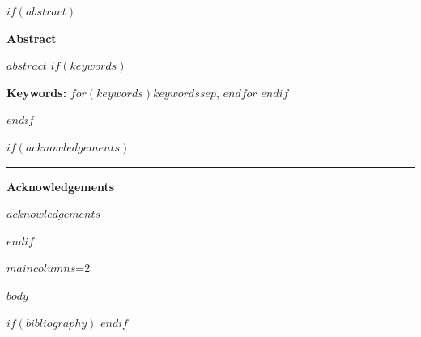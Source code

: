 \documentclass[12pt]{article}
\newif\ifjncanon
\newcommand{\jncmaincolumns}{$maincolumns$}
\newcommand{\jncmaincolumns}{1}
\begin{document}
\begin{titlepage}
\begin{center}
\begin{singlespace}
{}
\end{singlespace}

\vfill

$if(abstract)$
\begin{minipage}{0.8\textwidth}
\small
\singlespacing
\textbf{Abstract}\par
\vspace{0.25em}
$abstract$
$if(keywords)$

\vspace{1em}
\noindent\textbf{Keywords: }$for(keywords)$$keywords$$sep$, $endfor$
$endif$
\end{minipage}
$endif$

\vfill

$if(acknowledgements)$
\ifjncanon
\else
\begin{minipage}{0.8\textwidth}
\footnotesize
\singlespacing
\noindent\rule{0.3\textwidth}{0.4pt}\par
\textbf{Acknowledgements}\par
$acknowledgements$
\end{minipage}
\fi
$endif$

\end{center}
\end{titlepage}

\clearpage
\setcounter{page}{1}


\ifnum\jncmaincolumns=2\relax
  \twocolumn
\fi

\ifjncanon
\begingroup
\small
\noindent\textit{This manuscript is set to anonymous mode. Identifying metadata fields are suppressed on the title page.}\par
\endgroup
\vspace{1em}
\fi

$body$

$if(bibliography)$
\clearpage
$endif$
\end{document}
